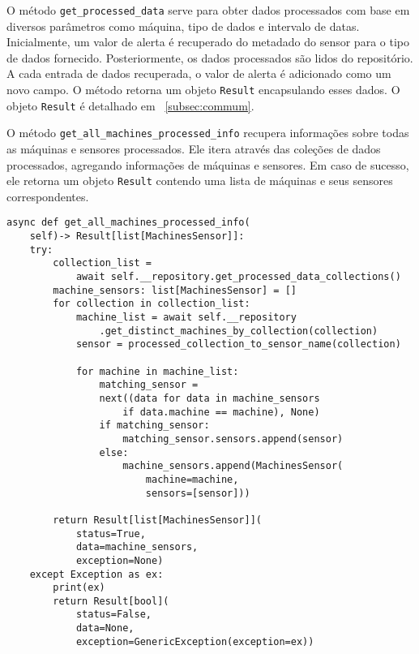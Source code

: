 O método \texttt{get\_processed\_data} serve para obter dados processados com base em diversos parâmetros como máquina, tipo de dados e intervalo de datas. Inicialmente, um valor de alerta é recuperado do metadado do sensor para o tipo de dados fornecido. Posteriormente, os dados processados são lidos do repositório. A cada entrada de dados recuperada, o valor de alerta é adicionado como um novo campo. O método retorna um objeto \texttt{Result} encapsulando esses dados. O objeto \texttt{Result} é detalhado em ~\ref{subsec:commum}.

O método \texttt{get\_all\_machines\_processed\_info} recupera informações sobre todas as máquinas e sensores processados. Ele itera através das coleções de dados processados, agregando informações de máquinas e sensores. Em caso de sucesso, ele retorna um objeto \texttt{Result} contendo uma lista de máquinas e seus sensores correspondentes.

\begin{verbatim}
async def get_all_machines_processed_info(
    self)-> Result[list[MachinesSensor]]:
    try:
        collection_list = 
            await self.__repository.get_processed_data_collections()
        machine_sensors: list[MachinesSensor] = []
        for collection in collection_list:
            machine_list = await self.__repository
                .get_distinct_machines_by_collection(collection)
            sensor = processed_collection_to_sensor_name(collection)

            for machine in machine_list:
                matching_sensor = 
                next((data for data in machine_sensors 
                    if data.machine == machine), None)
                if matching_sensor:
                    matching_sensor.sensors.append(sensor)
                else:
                    machine_sensors.append(MachinesSensor(
                        machine=machine,
                        sensors=[sensor]))
        
        return Result[list[MachinesSensor]](
            status=True,
            data=machine_sensors,
            exception=None)
    except Exception as ex:
        print(ex)
        return Result[bool](
            status=False,
            data=None,
            exception=GenericException(exception=ex)) 
\end{verbatim}

